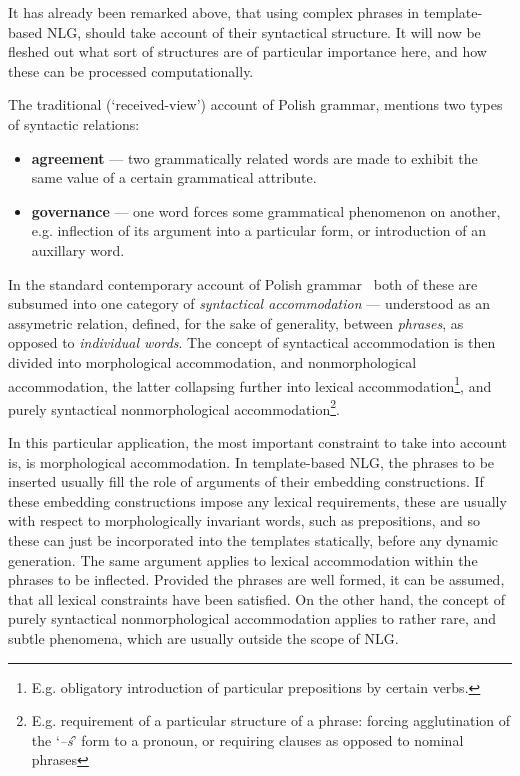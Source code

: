 \documentclass[12pt]{article}
\newcommand{\inlinegloss}[1]{`\textit{#1}'}
\begin{document}
It has already been remarked above, that using complex phrases in template-based NLG, should take account of their syntactical structure. It will now be fleshed out what sort of structures are of particular importance here, and how these can be processed computationally.

The traditional (`received-view') account of Polish grammar, mentions two types of syntactic relations: \begin{itemize}\vspace{-5pt}
\item \textbf{agreement} --- two grammatically related words are made to exhibit the same value of a certain grammatical attribute.\vspace{-5pt}
\item \textbf{governance} --- one word forces some grammatical phenomenon on another, e.g. inflection of its argument into a particular form, or introduction of an auxillary word.\vspace{-5pt}

\end{itemize}

In the standard contemporary account of Polish grammar~\cite{saloni:2012} both of these are subsumed into one category of \textit{syntactical accommodation} --- understood as an assymetric relation, defined, for the sake of generality, between \textit{phrases}, as opposed to \textit{individual words}. The concept of syntactical accommodation is then divided into morphological accommodation, and nonmorphological accommodation, the latter collapsing further into lexical accommodation\footnote{E.g. obligatory introduction of particular prepositions by certain verbs.}, and purely syntactical nonmorphological accommodation\footnote{E.g. requirement of a particular structure of a phrase: forcing agglutination of the \inlinegloss{--ś} form to a pronoun, or requiring clauses as opposed to nominal phrases}. 

In this particular application, the most important constraint to take into account is, is morphological accommodation. In template-based NLG, the phrases to be inserted usually fill the role of arguments of their embedding constructions. If these embedding constructions impose any lexical requirements, these are usually with respect to morphologically invariant words, such as prepositions, and so these can just be incorporated into the templates statically, before any dynamic generation. The same argument applies to lexical accommodation within the phrases to be inflected. Provided the phrases are well formed, it can be assumed, that all lexical constraints have been satisfied. On the other hand, the concept of purely syntactical nonmorphological accommodation applies to rather rare, and subtle phenomena, which are usually outside the scope of NLG.
\end{document}
